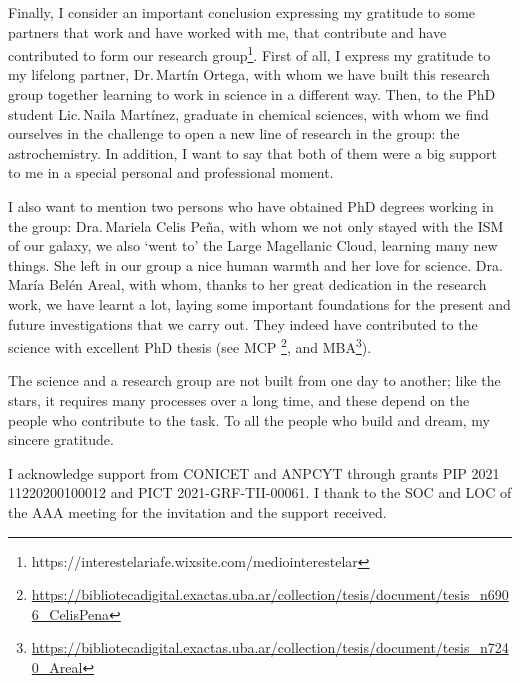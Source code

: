\documentclass[baaa]{baaa}
\begin{document}
Finally, I consider an important conclusion expressing my gratitude to some partners that work and have worked with me, that contribute and have contributed to form our research group\footnote{ {https://interestelariafe.wixsite.com/mediointerestelar}}.  
First of all, I express my gratitude to my lifelong partner,
Dr.\,Martín Ortega, with whom we have built this research group together learning to work in science in a different way.
Then, to the PhD student Lic.\,Naila Martínez, graduate
in chemical sciences, with whom we find ourselves in the challenge
to open a new line of research in the group: the astrochemistry.
In addition, I want to say that both of them were a big support to me in a special personal and professional moment.

I also want to mention two persons who have obtained PhD degrees
working in the group: Dra.\,Mariela Celis Peña, with whom we not only stayed
with the ISM of our galaxy, we also `went to' the Large Magellanic Cloud, learning many new things. She left in our group a nice human warmth and her love for science. Dra.\,María Belén Areal, with whom, thanks to her great dedication in the
research work, we have learnt a lot, laying some important foundations for the present and future investigations that we carry out. 
They indeed have contributed to the 
science with excellent PhD thesis (see MCP \footnote{\url{https://bibliotecadigital.exactas.uba.ar/collection/tesis/document/tesis_n6906_CelisPena}}, and MBA\footnote{\href{https://bibliotecadigital.exactas.uba.ar/collection/tesis/document/tesis_n7240_Areal}{https://bibliotecadigital.exactas.uba.ar/collection\allowbreak/tesis/document/tesis\_n7240\_Areal}}). 

The science and a research group are not built from one day to another; like the stars, it requires many processes over a long time, and these depend on the people who contribute to the task. To all the people who build and dream, my sincere gratitude.

\begin{acknowledgement}
I acknowledge support from CONICET and ANPCYT through grants PIP 2021 11220200100012 and PICT 2021-GRF-TII-00061. I thank to the SOC and LOC of the AAA meeting for the invitation and the support received. 
\end{acknowledgement}



\small

 
\end{document}
